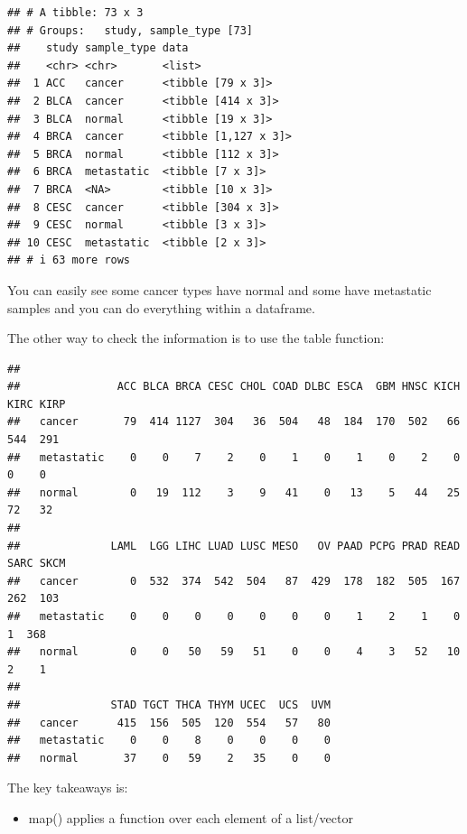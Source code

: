 \documentclass[
]{book}
\newenvironment{Shaded}{\begin{snugshade}}{\end{snugshade}}
\newcommand{\FunctionTok}[1]{\textcolor[rgb]{0.13,0.29,0.53}{\textbf{#1}}}
\newcommand{\NormalTok}[1]{#1}
\newcommand{\SpecialCharTok}[1]{\textcolor[rgb]{0.81,0.36,0.00}{\textbf{#1}}}
\providecommand{\tightlist}{%
  \setlength{\itemsep}{0pt}\setlength{\parskip}{0pt}}
\begin{document}
\begin{verbatim}
## # A tibble: 73 x 3
## # Groups:   study, sample_type [73]
##    study sample_type data                
##    <chr> <chr>       <list>              
##  1 ACC   cancer      <tibble [79 x 3]>   
##  2 BLCA  cancer      <tibble [414 x 3]>  
##  3 BLCA  normal      <tibble [19 x 3]>   
##  4 BRCA  cancer      <tibble [1,127 x 3]>
##  5 BRCA  normal      <tibble [112 x 3]>  
##  6 BRCA  metastatic  <tibble [7 x 3]>    
##  7 BRCA  <NA>        <tibble [10 x 3]>   
##  8 CESC  cancer      <tibble [304 x 3]>  
##  9 CESC  normal      <tibble [3 x 3]>    
## 10 CESC  metastatic  <tibble [2 x 3]>    
## # i 63 more rows
\end{verbatim}

You can easily see some cancer types have normal and some have metastatic samples and you can do everything within a dataframe.

The other way to check the information is to use the table function:

\begin{Shaded}
\end{Shaded}

\begin{verbatim}
##             
##               ACC BLCA BRCA CESC CHOL COAD DLBC ESCA  GBM HNSC KICH KIRC KIRP
##   cancer       79  414 1127  304   36  504   48  184  170  502   66  544  291
##   metastatic    0    0    7    2    0    1    0    1    0    2    0    0    0
##   normal        0   19  112    3    9   41    0   13    5   44   25   72   32
##             
##              LAML  LGG LIHC LUAD LUSC MESO   OV PAAD PCPG PRAD READ SARC SKCM
##   cancer        0  532  374  542  504   87  429  178  182  505  167  262  103
##   metastatic    0    0    0    0    0    0    0    1    2    1    0    1  368
##   normal        0    0   50   59   51    0    0    4    3   52   10    2    1
##             
##              STAD TGCT THCA THYM UCEC  UCS  UVM
##   cancer      415  156  505  120  554   57   80
##   metastatic    0    0    8    0    0    0    0
##   normal       37    0   59    2   35    0    0
\end{verbatim}

The key takeaways is:

\begin{itemize}
\tightlist
\item
  map() applies a function over each element of a list/vector
\end{itemize}
\end{document}

